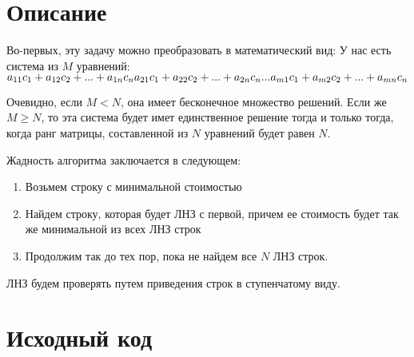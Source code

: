 \section{Описание}

Во-первых, эту задачу можно преобразовать в математический вид:
У нас есть система из $M$ уравнений:
$\\
a_{11}c_1 + a_{12}c_2 + ... + a_{1n}c_n \\
a_{21}c_1 + a_{22}c_2 + ... + a_{2n}c_n \\
... \\
a_{m1}c_1 + a_{m2}c_2 + ... + a_{mn}c_n \\ 
$

Очевидно, если $M < N$, она имеет бесконечное множество решений.
Если же $M \ge N$, то эта система будет имет единственное решение тогда и только тогда, когда ранг матрицы, составленной из $N$ уравнений будет равен $N$.

Жадность алгоритма заключается в следующем:
\begin{enumerate}
    \item Возьмем строку с минимальной стоимостью
    \item Найдем строку, которая будет ЛНЗ с первой, причем ее стоимость будет так же минимальной из всех ЛНЗ строк
    \item Продолжим так до тех пор, пока не найдем все $N$ ЛНЗ строк.
\end{enumerate}

ЛНЗ будем проверять путем приведения строк в ступенчатому виду.


\pagebreak

\section{Исходный код}

